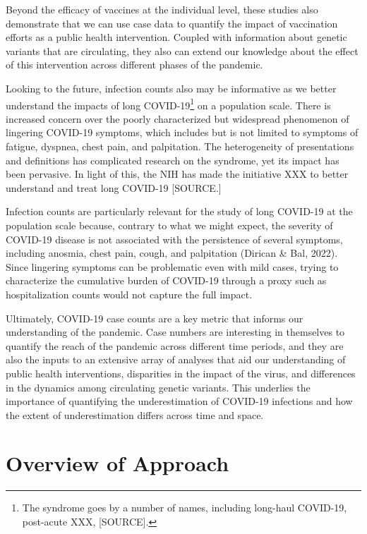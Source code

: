 \documentclass[12pt,twoside]{smiththesis}
\begin{document}
Beyond the efficacy of vaccines at the individual level, these studies also demonstrate that we can use case data to quantify the impact of vaccination efforts as a public health intervention. Coupled with information about genetic variants that are circulating, they also can extend our knowledge about the effect of this intervention across different phases of the pandemic.

Looking to the future, infection counts also may be informative as we better understand the impacts of long COVID-19\footnote{The syndrome goes by a number of names, including long-haul COVID-19, post-acute XXX, [SOURCE].} on a population scale. There is increased concern over the poorly characterized but widespread phenomenon of lingering COVID-19 symptoms, which includes but is not limited to symptoms of fatigue, dyspnea, chest pain, and palpitation. The heterogeneity of presentations and definitions has complicated research on the syndrome, yet its impact has been pervasive. In light of this, the NIH has made the initiative XXX to better understand and treat long COVID-19 {[}SOURCE.{]}

Infection counts are particularly relevant for the study of long COVID-19 at the population scale because, contrary to what we might expect, the severity of COVID-19 disease is not associated with the persistence of several symptoms, including anosmia, chest pain, cough, and palpitation (Dirican \& Bal, 2022). Since lingering symptoms can be problematic even with mild cases, trying to characterize the cumulative burden of COVID-19 through a proxy such as hospitalization counts would not capture the full impact.

Ultimately, COVID-19 case counts are a key metric that informs our understanding of the pandemic. Case numbers are interesting in themselves to quantify the reach of the pandemic across different time periods, and they are also the inputs to an extensive array of analyses that aid our understanding of public health interventions, disparities in the impact of the virus, and differences in the dynamics among circulating genetic variants. This underlies the importance of quantifying the underestimation of COVID-19 infections and how the extent of underestimation differs across time and space.

\hypertarget{overview-of-approach}{%
\chapter{Overview of Approach}\label{overview-of-approach}}
\end{document}
